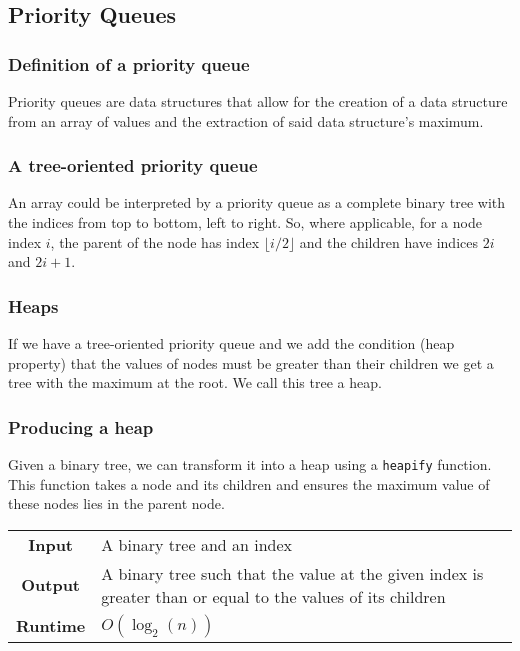 \documentclass[a4paper, 12pt, twoside]{article}
\begin{document}
\subsection{Priority Queues}

\subsubsection{Definition of a priority queue}

Priority queues are data structures that allow for the creation
of a data structure from an array of values and the extraction 
of said data structure's maximum.

\subsubsection{A tree-oriented priority queue}

An array could be interpreted by a priority queue as a complete 
binary tree with the indices from top to bottom, left to right. 
So, where applicable, for a node index $i$, the parent of the 
node has index $\lfloor i / 2 \rfloor$ and the children have 
indices $2i$ and $2i + 1$.

\subsubsection{Heaps}

If we have a tree-oriented priority queue and we add the condition
(heap property) that the values of nodes must be greater than
their children we get a tree with the maximum at the root. We
call this tree a heap.

\subsubsection{Producing a heap}

Given a binary tree, we can transform it into a heap using a
\texttt{heapify} function. This function takes a node and its children
and ensures the maximum value of these nodes lies in the parent node.

\begin{center}
      \begin{tabular}{ || c | p{8.5cm} || }
            \hline
                  \textbf{Input} & A binary tree and an index \\
                  \textbf{Output} & A binary tree such that the value 
                        at the given index is greater than or equal 
                        to the values of its children \\
            \hline\hline
                  \textbf{Runtime} & $O(\log_2(n))$ \\
            \hline
      \end{tabular}
\end{center}
\end{document}
